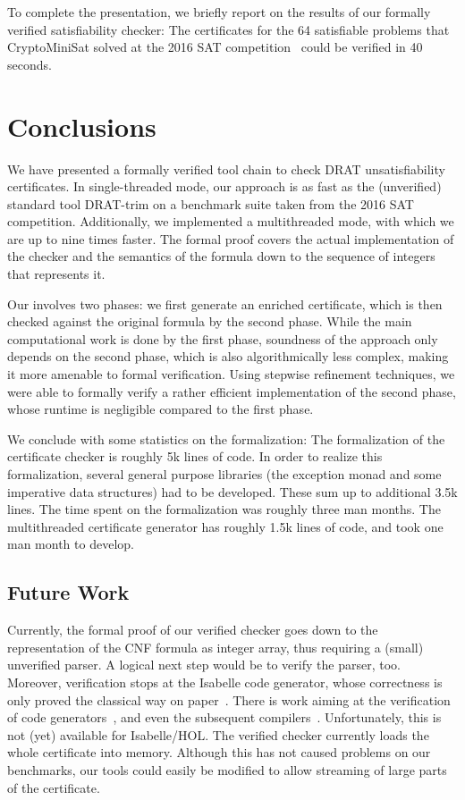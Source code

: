 \documentclass{llncs}
\begin{document}
To complete the presentation, we briefly report on the results of our formally verified satisfiability checker:
The certificates for the 64 satisfiable problems that CryptoMiniSat solved at the 2016 SAT competition~\cite{satcomp-2016} could be verified in 40 seconds.

\section{Conclusions}\label{sec:concl}
We have presented a formally verified tool chain to check DRAT unsatisfiability certificates. 
In single-threaded mode, our approach is as fast as the (unverified) standard tool DRAT-trim on a benchmark 
suite taken from the 2016 SAT competition. Additionally, we implemented a multithreaded mode, with 
which we are up to nine times faster.
The formal proof covers the actual implementation of the checker and the semantics of the 
formula down to the sequence of integers that represents it.

Our involves two phases: we first generate an enriched certificate, 
which is then checked against the original formula by the second phase.
While the main computational work is done by the first phase, soundness of the approach 
only depends on the second phase, which is also algorithmically less complex, making it more amenable to formal verification. 
Using stepwise refinement techniques, we were able to formally verify a rather efficient implementation of the second phase, 
whose runtime is negligible compared to the first phase.

We conclude with some statistics on the formalization: The formalization of the certificate checker is roughly 5k lines of code.
In order to realize this formalization, several general purpose libraries (\eg the exception monad and some imperative data structures) had to be developed. 
These sum up to additional 3.5k lines. The time spent on the formalization was roughly three man months. The multithreaded certificate generator has roughly 1.5k 
lines of code, and took one man month to develop.

\subsection{Future Work}
Currently, the formal proof of our verified checker goes down to the representation of the CNF formula as integer array,
thus requiring a (small) unverified parser. A logical next step would be to verify the parser, too.
Moreover, verification stops at the Isabelle code generator, whose correctness is only proved the classical way on paper~\cite{HaNi10,HKKN13}. 
There is work aiming at the verification of code generators~\cite{MO14}, and even the subsequent compilers~\cite{KMNO14}. 
Unfortunately, this is not (yet) available for Isabelle/HOL. 
The verified checker currently loads the whole certificate into memory. Although this has not caused problems on our benchmarks, 
our tools could easily be modified to allow streaming of large parts of the certificate.
\end{document}
